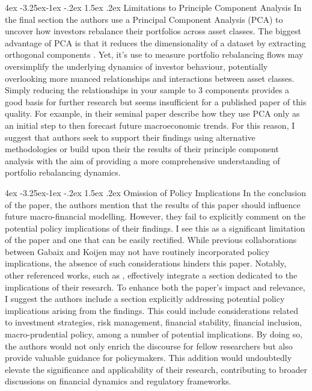 \documentclass[]{article}
\makeatletter
\renewcommand\subsection{\leftskip 4ex\@startsection{subsection}{2}{\z@}%
	{-3.25ex\@plus -1ex \@minus -.2ex}%
	{1.5ex \@plus .2ex}%
	{\normalfont\large\bfseries}}
\makeatother
\begin{document}
\begin{spacing}{1.25}
	\subsection{Limitations to Principle Component Analysis}
	In the final section the authors use a Principal Component Analysis (PCA) to uncover how investors rebalance their portfolios across asset classes. The biggest advantage of PCA is that it reduces the dimensionality of a dataset by extracting orthogonal components \parencite{tsoulfidis2022new}. Yet, it's use to measure portfolio rebalancing flows may oversimplify the underlying dynamics of investor behaviour, potentially overlooking more nuanced relationships and interactions between asset classes. Simply reducing the relationships in your sample to 3 components provides a good basis for further research but seems insufficient for a published paper of this quality. For example, in their seminal paper \cite{stock2002forecasting} describe how they use PCA only as an initial step to then forecast future macroeconomic trends. For this reason, I suggest that authors seek to support their findings using alternative methodologies or build upon their the results of their principle component analysis with the aim of providing a more comprehensive understanding of portfolio rebalancing dynamics.
	
	
	\subsection{Omission of Policy Implications}
	In the conclusion of the paper, the authors mention that the results of this paper should influence future macro-financial modelling. However, they fail to explicitly comment on the potential policy implications of their findings. I see this as a significant limitation of the paper and one that can be easily rectified. While previous collaborations between Gabaix and Koijen may not have routinely incorporated policy implications, the absence of such considerations hinders this paper. Notably, other referenced works, such as \cite{haddad2021competitive}, effectively integrate a section dedicated to the implications of their research. To enhance both the paper's impact and relevance, I suggest the authors include a section explicitly addressing potential policy implications arising from the findings.  This could include considerations related to investment strategies, risk management, financial stability, financial inclusion, macro-prudential policy, among a number of potential implications. By doing so, the authors would not only enrich the discourse for fellow researchers but also provide valuable guidance for policymakers. This addition would undoubtedly elevate the significance and applicability of their research, contributing to broader discussions on financial dynamics and regulatory frameworks. 
	

\end{spacing}
\end{document}

